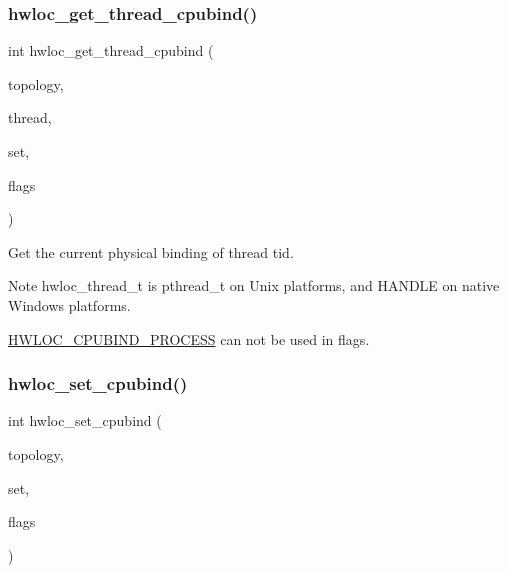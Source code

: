 \subsubsection{\texorpdfstring{hwloc\+\_\+get\+\_\+thread\+\_\+cpubind()}{hwloc\_get\_thread\_cpubind()}}
{\footnotesize\ttfamily int hwloc\+\_\+get\+\_\+thread\+\_\+cpubind (\begin{DoxyParamCaption}\item[{\hyperlink{a00186_ga9d1e76ee15a7dee158b786c30b6a6e38}{hwloc\+\_\+topology\+\_\+t}}]{topology,  }\item[{hwloc\+\_\+thread\+\_\+t}]{thread,  }\item[{\hyperlink{a00183_ga4bbf39b68b6f568fb92739e7c0ea7801}{hwloc\+\_\+cpuset\+\_\+t}}]{set,  }\item[{int}]{flags }\end{DoxyParamCaption})}



Get the current physical binding of thread {\ttfamily tid}. 

\begin{DoxyNote}{Note}
{\ttfamily hwloc\+\_\+thread\+\_\+t} is {\ttfamily pthread\+\_\+t} on Unix platforms, and {\ttfamily H\+A\+N\+D\+LE} on native Windows platforms.

\hyperlink{a00190_gga217dc8d373f8958cc93c154ebce1c71ca2e0dd0128dac6b03408c7dd170477fdc}{H\+W\+L\+O\+C\+\_\+\+C\+P\+U\+B\+I\+N\+D\+\_\+\+P\+R\+O\+C\+E\+SS} can not be used in {\ttfamily flags}. 
\end{DoxyNote}
\mbox{\label{a00190_ga80bc07473a8edf840cae17bd7ec21d48}} 
\subsubsection{\texorpdfstring{hwloc\+\_\+set\+\_\+cpubind()}{hwloc\_set\_cpubind()}}
{\footnotesize\ttfamily int hwloc\+\_\+set\+\_\+cpubind (\begin{DoxyParamCaption}\item[{\hyperlink{a00186_ga9d1e76ee15a7dee158b786c30b6a6e38}{hwloc\+\_\+topology\+\_\+t}}]{topology,  }\item[{\hyperlink{a00183_ga1f784433e9b606261f62d1134f6a3b25}{hwloc\+\_\+const\+\_\+cpuset\+\_\+t}}]{set,  }\item[{int}]{flags }\end{DoxyParamCaption})}



